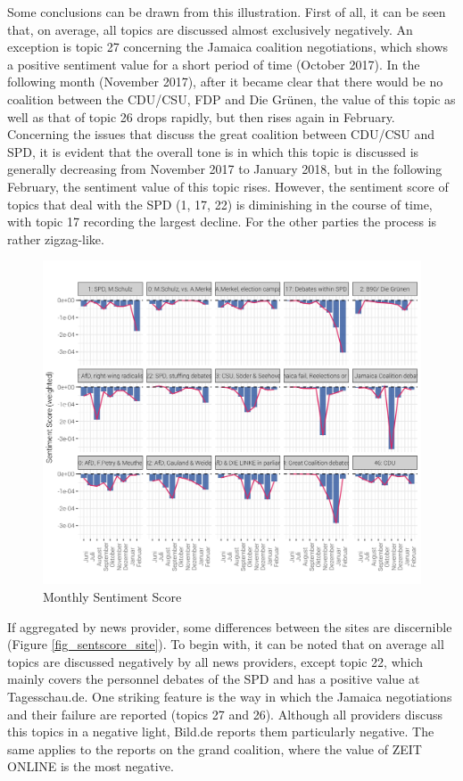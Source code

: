 \documentclass[12pt,a4paper,notitlepage]{article}
\begin{document}
Some conclusions can be drawn from this illustration. First of all, it can be seen that, on average, all topics are discussed almost exclusively negatively. An exception is topic 27 concerning the Jamaica coalition negotiations, which shows a positive sentiment value for a short period of time (October 2017). In the following month (November 2017), after it became clear that there would be no coalition between the CDU/CSU, FDP and Die Grünen, the value of this topic as well as that of topic 26 drops rapidly, but then rises again in February. Concerning the issues that discuss the great coalition between CDU/CSU and SPD, it is evident that the overall tone is in which this topic is discussed is generally decreasing from November 2017 to January 2018, but in the following February, the sentiment value of this topic rises. However, the sentiment score of topics that deal with the SPD (1, 17, 22) is diminishing in the course of time, with topic 17 recording the largest decline. For the other parties the process is rather zigzag-like.

\begin{figure}[H]
	\caption{Monthly Sentiment Score}
		\begin{center}
			\includegraphics[width=\textwidth,keepaspectratio]{../figs/sentscore_monthly.png}
		\end{center}
	\label{fig_sentscore_monthly}
\end{figure}

If aggregated by news provider, some differences between the sites are discernible (Figure \ref{fig_sentscore_site}). To begin with, it can be noted that on average all topics are discussed negatively by all news providers, except topic 22, which mainly covers the personnel debates of the SPD and has a positive value at Tagesschau.de. One striking feature is the way in which the Jamaica negotiations and their failure are reported (topics 27 and 26). Although all providers discuss this topics in a negative light, Bild.de reports them particularly negative. The same applies to the reports on the grand coalition, where the value of ZEIT ONLINE is the most negative. 
\end{document}
